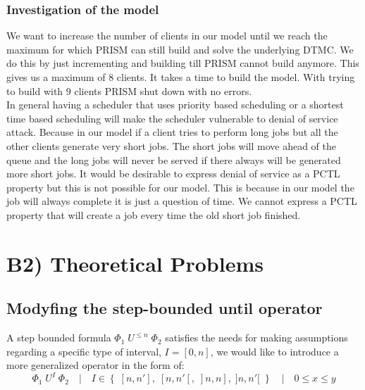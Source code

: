 \documentclass[12pt]{report}
\begin{document}
\subsubsection*{Investigation of the model}
We want to increase the number of clients in our model until we reach the maximum for which PRISM can still build and solve the underlying DTMC. We do this by just incrementing and building till PRISM cannot build anymore. This gives us a maximum of 8 clients. It takes a time to build the model. With trying to build with 9 clients PRISM shut down with no errors.\\
In general having a scheduler that uses priority based scheduling or a shortest time based scheduling will make the scheduler vulnerable to denial of service attack. Because in our model  if a client tries to perform long jobs but all the other clients generate very short jobs. The short jobs will move ahead of the queue and the long jobs will never be served if there always will be generated more short jobs. It would be desirable to express denial of service as a PCTL property but this is not possible for our model. This is because in our model the job will always complete it is just a question of time. We cannot express a PCTL property that will create a job every time the old short job finished.

\section*{B2) Theoretical Problems}
\subsection*{Modyfing the step-bounded until operator}
A step bounded formula $\Phi_1\;U^{\leqslant n}\;\Phi_2$ satisfies the needs for making assumptions regarding a specific type of interval, $I = [0, n]$, we would like to introduce a more generalized operator in the form of:
$$\Phi_1\;U^{I}\;\Phi_2 \quad | \quad I \in \left\{\;[n,n'],\;[n, n'[,\;]n, n],\;]n, n'[\;\right\} \quad | \quad 0 \leq x \leq y$$
\end{document}
